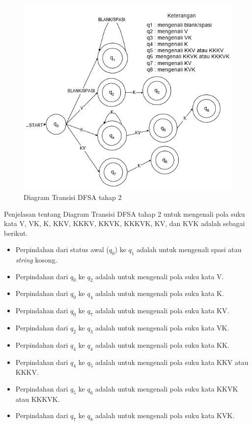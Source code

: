 \begin{figure}[H]
	\centering
	\includegraphics[scale=0.8]{Gambar/DFSA-2}
	\caption{Diagram Transisi DFSA tahap 2\cite{Thomas:2000} 
	\label{fig:2-DFSA-2}}
\end{figure}

Penjelasan tentang Diagram Transisi DFSA tahap 2 untuk mengenali pola suku kata V, VK, K, KKV, KKKV, KKVK, KKKVK, KV, dan KVK adalah sebagai berikut.

\begin{itemize}
	\item Perpindahan dari status awal (\textit{$q_0$}) ke \textit{$q_1$} adalah untuk mengenali spasi atau \textit{string} kosong.
	\item Perpindahan dari \textit{$q_0$} ke \textit{$q_2$} adalah untuk mengenali pola suku kata V.
	\item Perpindahan dari \textit{$q_0$} ke \textit{$q_4$} adalah untuk mengenali pola suku kata K.
	\item Perpindahan dari \textit{$q_0$} ke \textit{$q_7$} adalah untuk mengenali pola suku kata KV.
	\item Perpindahan dari \textit{$q_2$} ke \textit{$q_3$} adalah untuk mengenali pola suku kata VK.
	\item Perpindahan dari \textit{$q_4$} ke \textit{$q_4$} adalah untuk mengenali pola suku kata KK.
	\item Perpindahan dari \textit{$q_4$} ke \textit{$q_5$} adalah untuk mengenali pola suku kata KKV atau KKKV.
	\item Perpindahan dari \textit{$q_5$} ke \textit{$q_6$} adalah untuk mengenali pola suku kata KKVK atau KKKVK.
	\item Perpindahan dari \textit{$q_7$} ke \textit{$q_8$} adalah untuk mengenali pola suku kata KVK.
\end{itemize}

